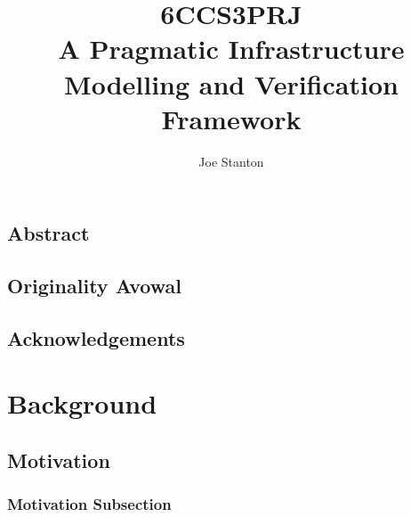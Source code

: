 \documentclass{cshonours}
\title{6CCS3PRJ \\
  A Pragmatic Infrastructure Modelling and Verification Framework}
\author{Joe Stanton}
\begin{document}
\maketitle

\section*{Abstract}
\section*{Originality Avowal}
\section*{Acknowledgements}

\tableofcontents

\chapter{Background}
\section{Motivation}
\subsection{Motivation Subsection}
% 
% 
% 
% 
% 
% 
% 

\printbibliography[title=References]
% 
\end{document}
